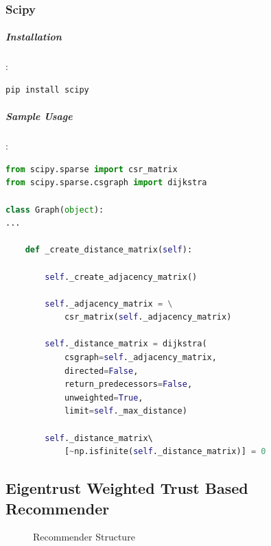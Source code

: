 \documentclass[12pt]{article}
\begin{document}
\subsubsection{Scipy}
\subparagraph{Installation}:
\begin{lstlisting}[language=bash]
pip install scipy
\end{lstlisting}

\subparagraph{Sample Usage}:
\begin{lstlisting}[language=python, caption=Scipy example]
from scipy.sparse import csr_matrix
from scipy.sparse.csgraph import dijkstra

class Graph(object):
...

	def _create_distance_matrix(self):

		self._create_adjacency_matrix()

		self._adjacency_matrix = \
			csr_matrix(self._adjacency_matrix)
		
		self._distance_matrix = dijkstra( 
			csgraph=self._adjacency_matrix, 
			directed=False, 
			return_predecessors=False, 
			unweighted=True,
			limit=self._max_distance)

		self._distance_matrix\ 
			[~np.isfinite(self._distance_matrix)] = 0
\end{lstlisting}


\subsection{Eigentrust Weighted Trust Based Recommender}
\begin{figure}[H]
	\centering
	\caption{Recommender Structure}
\end{figure}
\end{document}
